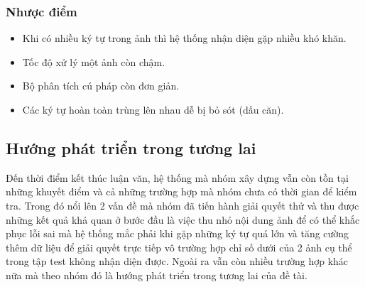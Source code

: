 \documentclass[a4paper,12pt]{article}
\begin{document}
	\subsubsection{Nhược điểm}
	
	\begin{itemize}
		\item Khi có nhiều ký tự trong ảnh thì hệ thống nhận diện gặp nhiều khó khăn.
		\item Tốc độ xử lý một ảnh còn chậm.
		\item Bộ phân tích cú pháp còn đơn giản.
		\item Các ký tự hoàn toàn trùng lên nhau dễ bị bỏ sót (dấu căn).
	\end{itemize}
	\subsection{Hướng phát triển trong tương lai}
	Đến thời điểm kết thúc luận văn, hệ thống mà nhóm xây dựng vẫn còn tồn tại những khuyết điểm và cả những trường hợp mà nhóm chưa có thời gian để kiểm tra. Trong đó nổi lên 2 vấn đề mà nhóm đã tiến hành giải quyết thử và thu được những kết quả khả quan ở bước đầu là việc thu nhỏ nội dung ảnh để có thể khắc phục lỗi sai mà hệ thống mắc phải khi gặp những ký tự quá lớn và tăng cường thêm dữ liệu để giải quyết trực tiếp vô trường hợp chỉ số dưới của 2 ảnh cụ thể trong tập test không nhận diện được. Ngoài ra vẫn còn nhiều trường hợp khác nữa mà theo nhóm đó là hướng phát triển trong tương lai của đề tài. 
	
\end{document}
